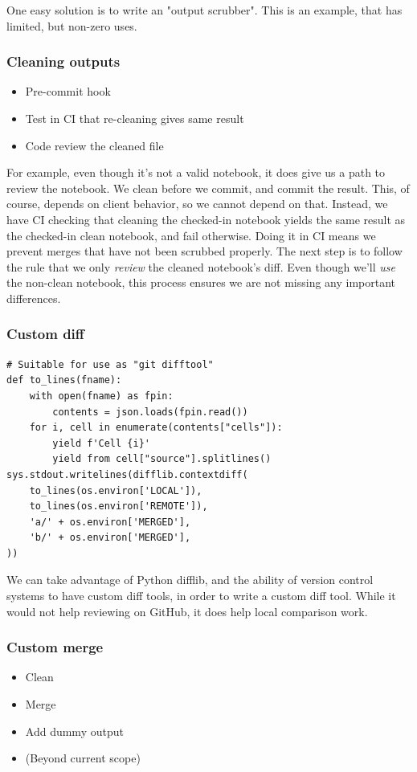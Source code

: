 One easy solution is to write an "output scrubber".
This is an example,
that has limited,
but non-zero uses.

\begin{frame}
\frametitle{Cleaning outputs}

\begin{itemize}
\item Pre-commit hook
\item Test in CI that re-cleaning gives same result
\item Code review the cleaned file
\end{itemize}

\end{frame}

For example,
even though it's not a valid notebook,
it does give us a path to review the notebook.
We clean before we commit,
and commit the result.
This,
of course,
depends on client behavior,
so we cannot depend on that.
Instead,
we have CI checking that cleaning the checked-in notebook
yields the same result as the checked-in clean notebook,
and fail otherwise.
Doing it in CI means we prevent merges that have not been scrubbed
properly.
The next step is to follow the rule that we only {\em review}
the cleaned notebook's diff.
Even though we'll {\em use} the non-clean notebook,
this process ensures we are not missing any important
differences.

\begin{frame}[fragile]
\frametitle{Custom diff}

\begin{lstlisting}
# Suitable for use as "git difftool"
def to_lines(fname):
    with open(fname) as fpin:
        contents = json.loads(fpin.read())
    for i, cell in enumerate(contents["cells"]):
        yield f'Cell {i}'
        yield from cell["source"].splitlines()
sys.stdout.writelines(difflib.contextdiff(
    to_lines(os.environ['LOCAL']),
    to_lines(os.environ['REMOTE']),
    'a/' + os.environ['MERGED'],
    'b/' + os.environ['MERGED'],
))
\end{lstlisting}

\end{frame}

We can take advantage of Python difflib,
and the ability of version control systems to
have custom diff tools,
in order to write a custom diff tool.
While it would not help reviewing on GitHub,
it does help local comparison work.

\begin{frame}
\frametitle{Custom merge}

\begin{itemize}
\item Clean
\item Merge
\item Add dummy output
\item (Beyond current scope)
\end{itemize}

\end{frame}


